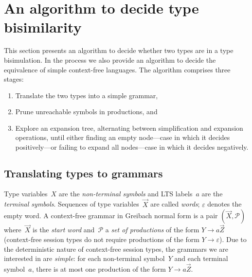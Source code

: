 \section{An algorithm to decide type bisimilarity}
\label{sec:algorithm}



This section presents an algorithm to decide whether two types are in
a type bisimulation. In the process we also provide an algorithm to
decide the equivalence of simple context-free languages.
%
The algorithm comprises three stages:
%
\begin{enumerate}
\item Translate the two types into a simple grammar,
\item Prune unreachable symbols in productions, and
\item Explore an expansion tree, alternating between simplification
  and expansion operations, until either finding an empty node---case
  in which it decides positively---or failing to expand all nodes---case
  in which it decides negatively.
\end{enumerate}

\subsection{Translating types to grammars}


Type variables~$X$ are the \emph{non-terminal symbols} and LTS
labels~$a$ are the \emph{terminal symbols}. Sequences of type
variables~$\vec X$ are called \emph{words}; $\varepsilon$ denotes the
empty word.
%
A context-free grammar in Greibach normal form is a pair
$(\vec X,\mathcal P)$ where~$\vec X$ is the \emph{start word}
and~$\mathcal P$ a \emph{set of productions} of the form
$Y \rightarrow a\vec Z$ (context-free session types do not require
productions of the form $Y \rightarrow\varepsilon$).
%
Due to the deterministic nature of context-free session types, the
grammars we are interested in are \emph{simple}: for each
non-terminal symbol~$Y$ and each terminal symbol~$a$, there is at most
one production of the form $Y \rightarrow a\vec Z$.

